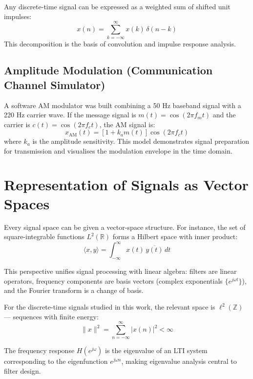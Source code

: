 \documentclass[11pt]{article}
\begin{document}
Any discrete-time signal can be expressed as a weighted sum of shifted unit impulses:
\[
  x(n) = \sum_{k=-\infty}^{\infty} x(k)\,\delta(n - k)
\]
This decomposition is the basis of convolution and impulse response analysis.

\subsection{Amplitude Modulation (Communication Channel Simulator)}

A software AM modulator was built combining a 50 Hz baseband signal with a 220 Hz carrier wave. If the message signal is $m(t) = \cos(2\pi f_m t)$ and the carrier is $c(t) = \cos(2\pi f_c t)$, the AM signal is:
\[
  x_{\text{AM}}(t) = \left[1 + k_a m(t)\right] \cos(2\pi f_c t)
\]
where $k_a$ is the amplitude sensitivity. This model demonstrates signal preparation for transmission and visualises the modulation envelope in the time domain.

 
\section{Representation of Signals as Vector Spaces}

Every signal space can be given a vector-space structure. For instance, the set of square-integrable functions $L^2(\mathbb{R})$ forms a Hilbert space with inner product:
\[
  \langle x, y \rangle = \int_{-\infty}^{\infty} x(t)\,\overline{y(t)}\,dt
\]

This perspective unifies signal processing with linear algebra: filters are linear operators, frequency components are basis vectors (complex exponentials $\{e^{j\omega t}\}$), and the Fourier transform is a change of basis.

For the discrete-time signals studied in this work, the relevant space is $\ell^2(\mathbb{Z})$ — sequences with finite energy:
\[
  \|x\|^2 = \sum_{n=-\infty}^{\infty} |x(n)|^2 < \infty
\]

The frequency response $H(e^{j\omega})$ is the eigenvalue of an LTI system corresponding to the eigenfunction $e^{j\omega n}$, making eigenvalue analysis central to filter design.
\end{document}

